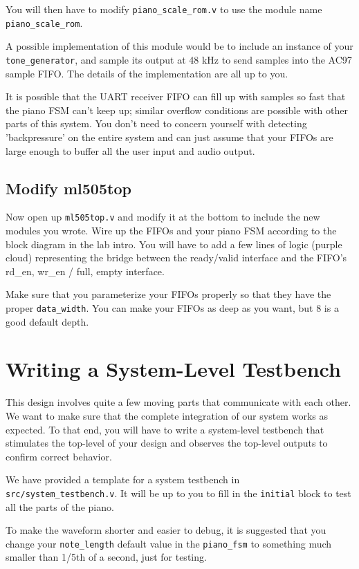 \documentclass[11pt]{article}
\begin{document}
You will then have to modify \verb|piano_scale_rom.v| to use the module name \verb|piano_scale_rom|.

A possible implementation of this module would be to include an instance of your \verb|tone_generator|, and sample its output at 48 kHz to send samples into the AC97 sample FIFO. The details of the implementation are all up to you.

It is possible that the UART receiver FIFO can fill up with samples so fast that the piano FSM can't keep up; similar overflow conditions are possible with other parts of this system. You don't need to concern yourself with detecting 'backpressure' on the entire system and can just assume that your FIFOs are large enough to buffer all the user input and audio output.

\subsection{Modify ml505top}
Now open up \verb|ml505top.v| and modify it at the bottom to include the new modules you wrote. Wire up the FIFOs and your piano FSM according to the block diagram in the lab intro. You will have to add a few lines of logic (purple cloud) representing the bridge between the ready/valid interface and the FIFO's rd\_en, wr\_en / full, empty interface. 

Make sure that you parameterize your FIFOs properly so that they have the proper \verb|data_width|. You can make your FIFOs as deep as you want, but 8 is a good default depth.

\section{Writing a System-Level Testbench}
This design involves quite a few moving parts that communicate with each other. We want to make sure that the complete integration of our system works as expected. To that end, you will have to write a system-level testbench that stimulates the top-level of your design and observes the top-level outputs to confirm correct behavior.

We have provided a template for a system testbench in \verb|src/system_testbench.v|. It will be up to you to fill in the \verb|initial| block to test all the parts of the piano.

To make the waveform shorter and easier to debug, it is suggested that you change your \verb|note_length| default value in the \verb|piano_fsm| to something much smaller than 1/5th of a second, just for testing.
\end{document}
